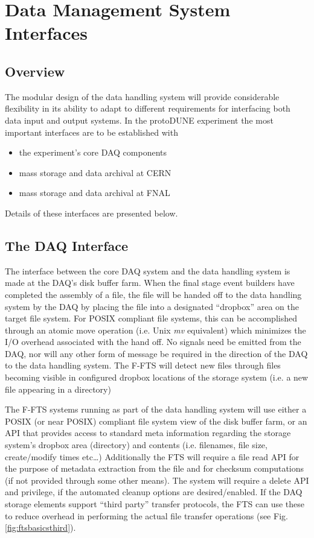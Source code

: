 \documentclass[12pt]{article}
\newcommand{\pd}{protoDUNE\xspace}
\begin{document}
\section{Data Management System Interfaces}
\subsection{Overview}
The modular design of the data handling system will provide considerable flexibility in its ability to adapt to different requirements
for interfacing  both data input and output systems.  In the \pd experiment the most important interfaces are to be established with
\begin{itemize}
\item the experiment’s core DAQ components
\item mass storage and data archival at CERN
\item mass storage and data archival at FNAL
\end{itemize}

\noindent
 Details of these interfaces are presented below.

\subsection{The DAQ Interface}
The interface between the core DAQ system and the data handling system is made at the DAQ’s disk buffer farm.
When the final stage event builders have completed the assembly of a file, the file will be handed off to the data handling system
by the DAQ by placing the file into a designated ``dropbox'' area on the target file system.  For POSIX compliant file systems,
this can be accomplished through an atomic move operation (i.e. Unix \textit{mv} equivalent) which minimizes the I/O overhead associated
with the hand off.  No signals need be emitted from the DAQ, nor will any other form of message be required in the direction of the
DAQ to the data handling system.  The F-FTS will detect new files through files becoming visible in configured dropbox locations of
the storage system (i.e. a new file appearing in a directory) 

The F-FTS systems running as part of the data handling system will use either a POSIX (or near POSIX) compliant file system view of the disk buffer farm,
or an API that provides access to standard meta information regarding the storage system’s dropbox area (directory) and contents
(i.e. filenames, file size, create/modify times etc…)  Additionally the FTS will require a file read API for the purpose of metadata
extraction from the file and for checksum computations (if not provided through some other means).  The system will require a
delete API and privilege, if the automated cleanup options are desired/enabled.  If the DAQ storage elements support ``third party''
transfer protocols, the FTS can use these to reduce overhead in performing the actual file transfer operations  (see Fig. \ref{fig:ftsbasicsthird}).
\end{document}
